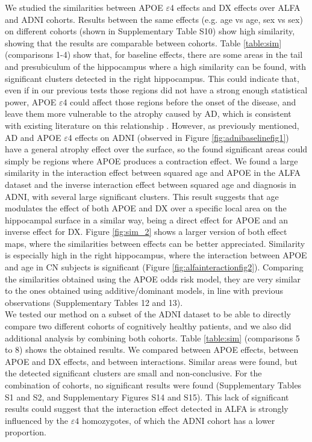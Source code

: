 We studied the similarities between APOE $\varepsilon$4 effects and DX effects over ALFA and ADNI cohorts. Results between the same effects (e.g. age vs age, sex vs sex) on different cohorts (shown in Supplementary Table S10) show high similarity, showing that the results are comparable between cohorts. Table \ref{table:sim} (comparisons 1-4) show that, for baseline effects, there are some areas in the tail and presubiculum of the hippocampus where a high similarity can be found, with significant clusters detected in the right hippocampus. This could indicate that, even if in our previous tests those regions did not have a strong enough statistical power, APOE $\varepsilon$4 could affect those regions before the onset of the disease, and leave them more vulnerable to the atrophy caused by AD, which is consistent with existing literature on this relationship \cite{Wolk2010}. However, as previously mentioned, AD and APOE $\varepsilon$4 effects on ADNI (observed in Figure \ref{fig:adnibaselinefig1}) have a general atrophy effect over the surface, so the found significant areas could simply be regions where APOE produces a contraction effect. We found a large similarity in the interaction effect between squared age and APOE in the ALFA dataset and the inverse interaction effect between squared age and diagnosis in ADNI, with several large significant clusters. This result suggests that age modulates the effect of both APOE and DX over a specific local area on the hippocampal surface in a similar way, being a direct effect for APOE and an inverse effect for DX. Figure \ref{fig:sim_2} shows a larger version of both effect maps, where the similarities between effects can be better appreciated. Similarity is especially high in the right hippocampus, where the interaction between APOE and age in CN subjects is significant (Figure \ref{fig:alfainteractionfig2}). Comparing the similarities obtained using the APOE odds risk model, they are very similar to the ones obtained using additive/dominant models, in line with previous observations (Supplementary Tables 12 and 13).  \\ 

We tested our method on a subset of the ADNI dataset to be able to directly compare two different cohorts of cognitively healthy patients, and we also did additional analysis by combining both cohorts. Table \ref{table:sim} (comparisons 5 to 8) shows the obtained results. We compared between APOE effects, between APOE and DX effects, and between interactions. Similar areas were found, but the detected significant clusters are small and non-conclusive. For the combination of cohorts, no significant results were found (Supplementary Tables S1 and S2, and Supplementary Figures S14 and S15). This lack of significant results could suggest that the interaction effect detected in ALFA is strongly influenced by the $\varepsilon4$ homozygotes, of which the ADNI cohort has a lower proportion. \\ 

